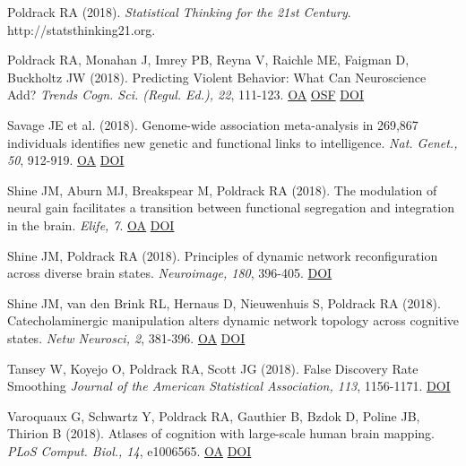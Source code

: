 Poldrack RA (2018).  \textit{Statistical Thinking for the 21st Century}. http://statsthinking21.org. \vspace{2mm}

Poldrack RA, Monahan J, Imrey PB, Reyna V, Raichle ME, Faigman D, Buckholtz JW (2018). Predicting Violent Behavior: What Can Neuroscience Add? \textit{Trends Cogn. Sci. (Regul. Ed.), 22}, 111-123. \href{https://www.ncbi.nlm.nih.gov/pmc/articles/PMC5794654}{OA} \href{https://osf.io/tgknp/}{OSF} \href{http://dx.doi.org/10.1016/j.tics.2017.11.003}{DOI} \vspace{2mm}

Savage JE et al. (2018). Genome-wide association meta-analysis in 269,867 individuals identifies new genetic and functional links to intelligence. \textit{Nat. Genet., 50}, 912-919. \href{https://www.ncbi.nlm.nih.gov/pmc/articles/PMC6411041}{OA} \href{http://dx.doi.org/10.1038/s41588-018-0152-6}{DOI} \vspace{2mm}

Shine JM, Aburn MJ, Breakspear M, Poldrack RA (2018). The modulation of neural gain facilitates a transition between functional segregation and integration in the brain. \textit{Elife, 7}. \href{https://www.ncbi.nlm.nih.gov/pmc/articles/PMC5818252}{OA} \href{http://dx.doi.org/10.7554/elife.31130}{DOI} \vspace{2mm}

Shine JM, Poldrack RA (2018). Principles of dynamic network reconfiguration across diverse brain states. \textit{Neuroimage, 180}, 396-405. \href{http://dx.doi.org/10.1016/j.neuroimage.2017.08.010}{DOI} \vspace{2mm}

Shine JM, van den Brink RL, Hernaus D, Nieuwenhuis S, Poldrack RA (2018). Catecholaminergic manipulation alters dynamic network topology across cognitive states. \textit{Netw Neurosci, 2}, 381-396. \href{https://www.ncbi.nlm.nih.gov/pmc/articles/PMC6145851}{OA} \href{http://dx.doi.org/10.1162/netn\_a\_00042}{DOI} \vspace{2mm}

Tansey W, Koyejo O, Poldrack RA, Scott JG (2018). False Discovery Rate Smoothing \textit{Journal of the American Statistical Association, 113}, 1156-1171. \href{http://dx.doi.org/10.1080/01621459.2017.1319838}{DOI} \vspace{2mm}

Varoquaux G, Schwartz Y, Poldrack RA, Gauthier B, Bzdok D, Poline JB, Thirion B (2018). Atlases of cognition with large-scale human brain mapping. \textit{PLoS Comput. Biol., 14}, e1006565. \href{https://www.ncbi.nlm.nih.gov/pmc/articles/PMC6289578}{OA} \href{http://dx.doi.org/10.1371/journal.pcbi.1006565}{DOI} \vspace{2mm}

